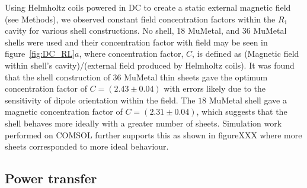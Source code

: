 \documentclass[11pt]{iopart}
\begin{document}
Using Helmholtz coils powered in DC to create a static external
magnetic field (see Methods), we observed constant field concentration
factors within the $R_1$ cavity for various shell constructions. No
shell, 18 MuMetal, and 36 MuMetal shells were used and their
concentration factor with field may be seen in
figure~\ref{fig:DC_RL}$a$, where concentration factor, $C$, is defined
as (Magnetic field within shell's cavity)/(external field produced by
Helmholtz coils). It was found that the shell construction of $36$
MuMetal thin sheets gave the optimum concentration factor of $C =
(2.43\pm0.04)$ with errors likely due to the sensitivity of dipole
orientation within the field. The $18$ MuMetal shell gave a magnetic
concentration factor of $C = (2.31\pm0.04)$, which suggests that the
shell behaves more ideally with a greater number of sheets. Simulation
work performed on COMSOL further supports this as shown in figureXXX
where more sheets corresponded to more ideal behaviour.

\subsection{Power transfer}
\end{document}
